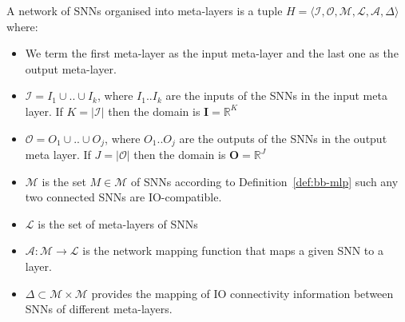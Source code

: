 \begin{definition}
	\label{def:nsanns}
	A network of \acp{SNN} organised into meta-layers is a tuple $H = \langle \mathcal{I}, \mathcal{O}, \mathcal{M}, \mathcal{L}, \mathcal{A}, \Delta \rangle$ where:
	\begin{itemize}
		\item We term the first meta-layer as the input
		meta-layer and the last one as the output
		meta-layer.
		\item  $\mathcal{I}=I_1 \cup .. \cup I_k$,
		where $I_1..I_k$ are the inputs of the \acp{SNN} in
		the input meta layer. If $K=|\mathcal{I}|$ then the
		domain is $\mathbf{I} = \mathbb{R}^K$
		\item $\mathcal{O}=O_1 \cup .. \cup O_j$,
		where $O_1..O_j$ are the outputs of the \acp{SNN} in
		the output meta layer. If $J=|\mathcal{O}|$ then the domain is $\mathbf{O} = \mathbb{R}^J$
		\item $\mathcal{M}$ is the set $M \in \mathcal{M}$ of
		\acp{SNN} according to Definition~\ref{def:bb-mlp}
		such any two connected \acp{SNN} are IO-compatible.
		\item $\mathcal{L}$ is the set of meta-layers of \acp{SNN}
		\item $\mathcal{A}: \mathcal{M} \rightarrow \mathcal{L}$ is the network mapping function that maps a given \ac{SNN} to a layer.
		\item $\Delta \subset \mathcal{M} \times \mathcal{M}$ provides the mapping of IO connectivity information between \acp{SNN} of different meta-layers. %
	\end{itemize}
\end{definition}

